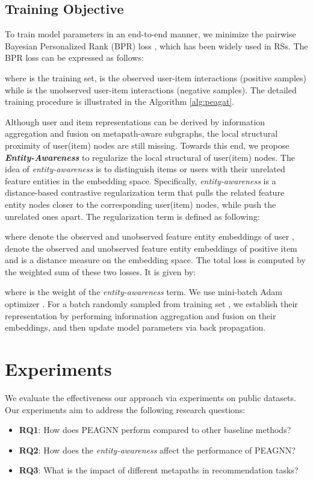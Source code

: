 \documentclass[runningheads, envcountsame, a4paper]{llncs}
\begin{document}
\subsection{Training Objective}
To train model parameters in an end-to-end manner, we minimize the 
pairwise Bayesian Personalized Rank (BPR) loss \cite{rendle2012bpr}, which has 
been widely used in RSs. 
The BPR loss can be expressed as follows:

where  is the training set,  is the observed user-item interactions (positive samples) while  is the unobserved user-item interactions (negative samples). The detailed training procedure is illustrated in the Algorithm \ref{alg:peagat}.


Although user and item representations can be derived by information aggregation and fusion on metapath-aware subgraphs, the local structural proximity of user(item) nodes are still missing. Towards this end, we propose \textbf{\emph{Entity-Awareness}} to regularize the local structural of user(item) nodes. The idea of \emph{entity-awareness} is to distinguish items or users with their unrelated feature entities in the embedding space. Specifically, \emph{entity-awareness} is a distance-based contrastive regularization term that pulls the related feature entity nodes closer to the corresponding user(item) nodes, while push the unrelated ones apart. The regularization term is defined as following: 
 \vspace{-1mm}

where  denote the observed and unobserved feature entity embeddings of user ,   denote the observed and unobserved feature entity embeddings of positive item  and  is a distance measure on the embedding space. 
The total loss is computed by the weighted sum of these two losses. It is given by:

where  is the weight of the \emph{entity-awareness} term.
We use mini-batch Adam optimizer \cite{kingma2014adam}.
For a batch randomly sampled from training set , we establish their representation by performing information aggregation and fusion on their embeddings, and then update model parameters via back propagation. \renewcommand{\thefootnote}{\arabic{footnote}}
\section{Experiments}
We evaluate the effectiveness our approach via experiments on public datasets.
Our experiments aim to address the following research questions:
\begin{itemize}[noitemsep]
    \item \textbf{RQ1}: How does PEAGNN perform compared to other 
    baseline methods?
    \item \textbf{RQ2}: How does the \emph{entity-awareness} affect the 
    performance of PEAGNN?
    \item \textbf{RQ3}: What is the impact of different metapaths in recommendation tasks?
\end{itemize}
\end{document}
